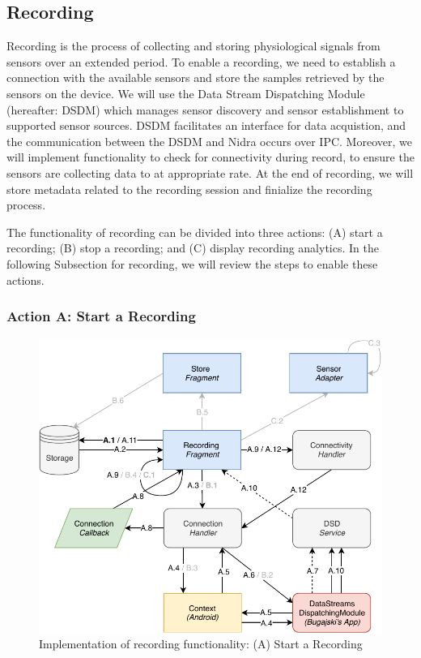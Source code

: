 \subsection{Recording}
Recording is the process of collecting and storing physiological signals from sensors over an extended period. To enable a recording, we need to establish a connection with the available sensors and store the samples retrieved by the sensors on the device. We will use the Data Stream Dispatching Module (hereafter: DSDM) which manages sensor discovery and sensor establishment to supported sensor sources. DSDM facilitates an interface for data acquistion, and the communication between the DSDM and Nidra occurs over IPC. Moreover, we will implement functionality to check for connectivity during record, to ensure the sensors are collecting data to at appropriate rate. At the end of recording, we will store metadata related to the recording session and finialize the recording process. 


The functionality of recording can be divided into three actions: (A) start a recording; (B) stop a recording; and (C) display recording analytics. In the following Subsection for recording, we will review the steps to enable these actions. 

\subsubsection{Action A: Start a Recording}
\begin{figure}
    \centering
    \includegraphics[scale=0.7]{images/Recording_ImpA.pdf}
    \caption{Implementation of recording functionality: (A) Start a Recording}
    \label{fig:impl_recordingA}
\end{figure}


